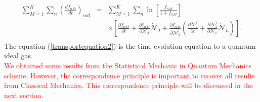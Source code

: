 \documentclass{article}
\begin{document}
\begin{eqnarray}
    \sum_{M=1}^{K}\sum_n \left( \frac{df_{nM}}{dt} \right)_{coll}&=&\sum_{M=1}^{K} \sum_n \ln \left[ \frac{f_{nM}}{1\mp f_{nM}} \right] \nonumber \\
    &&\times \left[ \frac{\partial f_{nM}}{\partial t}+\frac{\partial f_{nM}}{\partial \mathcal{N}_J}\dot{\mathcal{N}}_J+\frac{\partial f_{nM}}{\partial \mathcal{N}_J^{j}}\left( \frac{\partial \mathcal{N}_J^{j}}{\partial t}+\frac{\partial \mathcal{N}_J^{j}}{\partial \mathcal{N}_L}\dot{\mathcal{N}}_L \right) \right].  \nonumber \\ \label{transportequation2}
\end{eqnarray}
The equation (\ref{transportequation2}) is the time evolution equation to a quantum ideal gas. \\
\textcolor{red}{We obtained some results from the Statistical Mechanic in Quantum Mechanics scheme. However, the correspondence principle is important to recover all results from Classical Mechanics. This correspondence principle will be discussed in the next section.}

  





\end{document}
